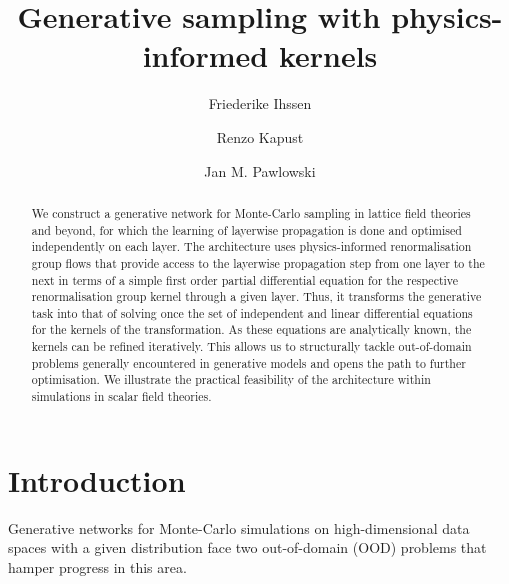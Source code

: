 \documentclass[reprint,amsmath,amssymb,aps,pra,superscriptaddress,nofootinbib,twocolumn,floatfix,nolongbibliography]{revtex4-2}
\begin{document}

\title{Generative sampling with physics-informed kernels}
\author{Friederike Ihssen}
\author{Renzo Kapust}


\author{Jan M. Pawlowski}
%


\begin{abstract}
	
We construct a generative network for Monte-Carlo sampling in lattice field theories and beyond, for which the learning of layerwise propagation is done and optimised independently on each layer. 
The architecture uses physics-informed renormalisation group flows that provide access to the layerwise propagation step from one layer to the next in terms of a simple first order partial differential equation for the respective renormalisation group kernel through a given layer. 
Thus, it transforms the generative task into that of solving once the set of independent and linear differential equations for the kernels of the transformation. As these equations are analytically known, the kernels can be refined iteratively. This allows us to structurally tackle out-of-domain problems generally encountered in generative models and opens the path to further optimisation. We illustrate the practical feasibility of the architecture within simulations in scalar field theories. 

\end{abstract}

\maketitle


\section{Introduction}
\label{sec:Introduction}

Generative networks for Monte-Carlo simulations on high-dimensional data spaces with a given distribution face two out-of-domain (OOD) problems that hamper progress in this area. 
\end{document}
